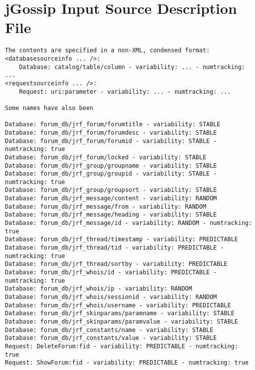 \documentclass[msc,oneside]{ubcthesis}
\begin{document}
\section{jGossip Input Source Description File}
\label{idf:jgossip}
\begin{verbatim}
The contents are specified in a non-XML, condensed format:
<databasesourceinfo ... />:
	Database: catalog/table/column - variability: ... - numtracking: ...
<requestsourceinfo ... />:
	Request: uri:parameter - variability: ... - numtracking: ...
	
Some names have also been 
	
Database: forum_db/jrf_forum/forumtitle - variability: STABLE
Database: forum_db/jrf_forum/forumdesc - variability: STABLE
Database: forum_db/jrf_forum/forumid - variability: STABLE - numtracking: true
Database: forum_db/jrf_forum/locked - variability: STABLE
Database: forum_db/jrf_group/groupname - variability: STABLE
Database: forum_db/jrf_group/groupid - variability: STABLE - numtracking: true
Database: forum_db/jrf_group/groupsort - variability: STABLE
Database: forum_db/jrf_message/content - variability: RANDOM
Database: forum_db/jrf_message/from - variability: RANDOM
Database: forum_db/jrf_message/heading - variability: STABLE
Database: forum_db/jrf_message/id - variability: RANDOM - numtracking: true
Database: forum_db/jrf_thread/timestamp - variability: PREDICTABLE
Database: forum_db/jrf_thread/tid - variability: PREDICTABLE - numtracking: true
Database: forum_db/jrf_thread/sortby - variability: PREDICTABLE
Database: forum_db/jrf_whois/id - variability: PREDICTABLE - numtracking: true
Database: forum_db/jrf_whois/ip - variability: RANDOM
Database: forum_db/jrf_whois/sessionid - variability: RANDOM
Database: forum_db/jrf_whois/username - variability: PREDICTABLE
Database: forum_db/jrf_skinparams/paramname - variability: STABLE
Database: forum_db/jrf_skinparams/paramvalue - variability: STABLE
Database: forum_db/jrf_constants/name - variability: STABLE
Database: forum_db/jrf_constants/value - variability: STABLE
Request: DeleteForum:fid - variability: PREDICTABLE - numtracking: true
Request: ShowForum:fid - variability: PREDICTABLE - numtracking: true
\end{verbatim}
\end{document}
